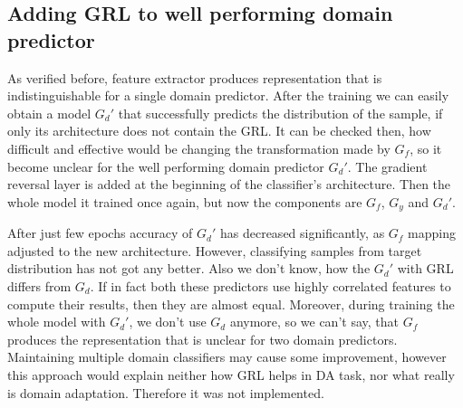 \documentclass{article}
\begin{document}
\subsection{Adding GRL to well performing domain predictor}
As verified before, feature extractor produces representation that is indistinguishable for a single domain predictor. After the training we can easily obtain a model $G_{d}'$ that successfully predicts the distribution of the sample, if only its architecture does not contain the GRL. It can be checked then, how difficult and effective would be changing the transformation made by $G_{f}$, so it become unclear for the well performing domain predictor $G_{d}'$. The gradient reversal layer is added at the beginning of the classifier's architecture. Then the whole model it trained once again, but now the components are $G_{f}$, $G_{y}$ and $G_{d}'$. 
\par
After just few epochs accuracy of $G_{d}'$ has decreased significantly, as $G_{f}$ mapping adjusted to the new architecture. However, classifying samples from target distribution has not got any better. Also we don't know, how the $G_{d}'$ with GRL differs from $G_{d}$. If in fact both these predictors use highly correlated features to compute their results, then they are almost equal. Moreover, during training the whole model with $G_{d}'$, we don't use $G_{d}$ anymore, so we can't say, that $G_{f}$ produces the representation that is unclear for two domain predictors. Maintaining multiple domain classifiers may cause some improvement, however this approach would explain neither how GRL helps in DA task, nor what really is domain adaptation. Therefore it was not implemented.
\end{document}
